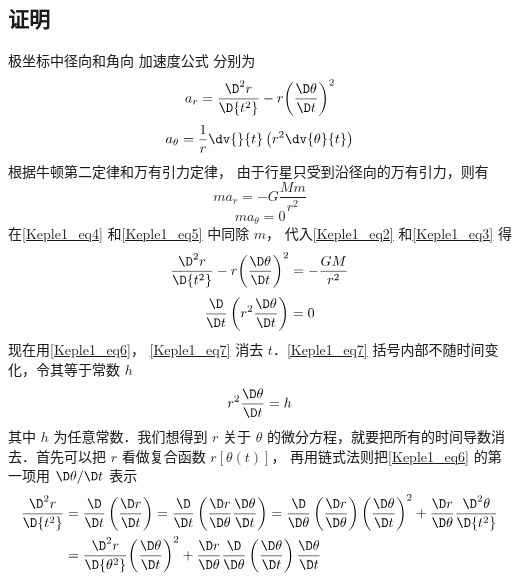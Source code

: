 \subsection{证明}
极坐标中径向和角向%
加速度公式%
分别为
\begin{equation}\label{Keple1_eq2}
{a_r} = \frac{{{\D^2}r}}{{\D{t^2}}} - r{\left( {\frac{{\D\theta }}{{\D t}}} \right)^2}
\end{equation}
\begin{equation}\label{Keple1_eq3}
a_\theta = \frac{1}{r}\dv{}{t}\left(r^2\dv{\theta}{t} \right)
\end{equation}
根据牛顿第二定律和万有引力定律，%
由于行星只受到沿径向的万有引力，则有
\begin{equation}\label{Keple1_eq4}
m{a_r} =  - G\frac{{Mm}}{{{r^2}}}
\end{equation}
\begin{equation}\label{Keple1_eq5}
m{a_\theta } = 0
\end{equation}
在\autoref{Keple1_eq4} 和\autoref{Keple1_eq5} 中同除 $m$，  代入\autoref{Keple1_eq2} 和\autoref{Keple1_eq3} 得
\begin{equation}\label{Keple1_eq6}
\frac{{{\D^2}r}}{{\D{t^2}}} - r{\left( {\frac{{\D\theta }}{{\D t}}} \right)^2} =  - \frac{{GM}}{{{r^2}}}
\end{equation}
\begin{equation}\label{Keple1_eq7}
\frac{\D}{{\D t}}\left( {{r^2}\frac{{\D\theta }}{{\D t}}} \right) = 0
\end{equation}
现在用\autoref{Keple1_eq6}， \autoref{Keple1_eq7} 消去 $t$．\autoref{Keple1_eq7} 括号内部不随时间变化，令其等于常数 $h$
\begin{equation}\label{Keple1_eq8}
{r^2}\frac{{\D\theta }}{{\D t}} = h
\end{equation}
其中 $h$ 为任意常数．我们想得到 $r$ 关于 $\theta$ 的微分方程，就要把所有的时间导数消去．首先可以把 $r$ 看做复合函数 $r[\theta(t)]$， 再用链式法则把\autoref{Keple1_eq6} 的第一项用 $\D\theta/\D t$ 表示
\begin{equation}\label{Keple1_eq10}
\begin{aligned}
\frac{{{\D^2}r}}{{\D{t^2}}} & = \frac{\D}{{\D t}}\left(\frac{{\D r}}{{\D t}}\right) = \frac{\D}{{\D t}}\left( {\frac{{\D r}}{{\D\theta }}\frac{{\D\theta }}{{\D t}}} \right) = \frac{\D}{{\D\theta }}\left( {\frac{{\D r}}{{\D\theta }}} \right){\left( {\frac{{\D\theta }}{{\D t}}} \right)^2} + \frac{{\D r}}{{\D\theta }}\frac{{{\D^2}\theta }}{{\D{t^2}}}\\
& = \frac{{{\D^2}r}}{{\D{\theta ^2}}}{\left( {\frac{{\D\theta }}{{\D t}}} \right)^2} + \frac{{\D r}}{{\D\theta }}\frac{\D}{{\D\theta }}\left( {\frac{{\D\theta }}{{\D t}}} \right)\frac{{\D\theta }}{{\D t}}
\end{aligned}
\end{equation}
